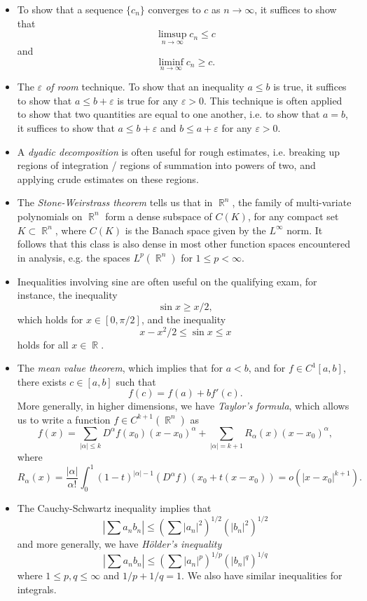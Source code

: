 \documentclass[answers]{exam}
\DeclareMathOperator{\RR}{\mathbb{R}}
\theoremstyle{problemstyle}
\newcommand{\1}[1]{\textbf{1}_{\left[#1\right]}} %
\begin{document}
\begin{itemize}
	\item To show that a sequence $\{ c_n \}$ converges to $c$ as $n \to \infty$, it suffices to show that
	\[ \limsup_{n \to \infty} c_n \leq c \]
	and
	\[ \liminf_{n \to \infty} c_n \geq c. \]

	\item The \emph{$\varepsilon$ of room} technique. To show that an inequality $a \leq b$ is true, it suffices to show that $a \leq b + \varepsilon$ is true for any $\varepsilon > 0$. This technique is often applied to show that two quantities are equal to one another, i.e. to show that $a = b$, it suffices to show that $a \leq b + \varepsilon$ and $b \leq a + \varepsilon$ for any $\varepsilon > 0$.

	\item A \emph{dyadic decomposition} is often useful for rough estimates, i.e. breaking up regions of integration / regions of summation into powers of two, and applying crude estimates on these regions.

	\item The \emph{Stone-Weirstrass theorem} tells us that in $\RR^n$, the family of multi-variate polynomials on $\RR^n$ form a dense subspace of $C(K)$, for any compact set $K \subset \RR^n$, where $C(K)$ is the Banach space given by the $L^\infty$ norm. It follows that this class is also dense in most other function spaces encountered in analysis, e.g. the spaces $L^p(\RR^n)$ for $1 \leq p < \infty$.

	\item Inequalities involving sine are often useful on the qualifying exam, for instance, the inequality
	\[ \sin x \geq x/2, \]
	which holds for $x \in [0, \pi/2]$, and the inequality
	\[ x - x^2/2 \leq \sin x \leq x \]
	holds for all $x \in \RR$.

	\item The \emph{mean value theorem}, which implies that for $a < b$, and for $f \in C^1[a,b]$, there exists $c \in [a,b]$ such that
	\[ f(c) = f(a) + b f'(c). \]
	More generally, in higher dimensions, we have \emph{Taylor's formula}, which allows us to write a function $f \in C^{k+1}(\RR^n)$ as
	\[ f(x) = \sum_{|\alpha| \leq k} D^\alpha f(x_0) (x - x_0)^\alpha + \sum_{|\alpha| = k+1} R_\alpha(x) (x - x_0)^\alpha, \]
	where
	\[ R_\alpha(x) = \frac{|\alpha|}{\alpha!} \int_0^1 (1 - t)^{|\alpha|-1} (D^\alpha f)(x_0 + t(x - x_0)) = o(|x - x_0|^{k+1}). \]

	\item The Cauchy-Schwartz inequality implies that
	\[ | \sum a_n b_n | \leq \left( \sum |a_n|^2 \right)^{1/2} \left( |b_n|^2 \right)^{1/2} \]
	and more generally, we have \emph{H\"{o}lder's inequality}
	\[ | \sum a_n b_n | \leq \left( \sum |a_n|^p \right)^{1/p} \left( |b_n|^q \right)^{1/q} \]
	where $1 \leq p,q \leq \infty$ and $1/p + 1/q = 1$. We also have similar inequalities for integrals.


\end{itemize}
\end{document}
